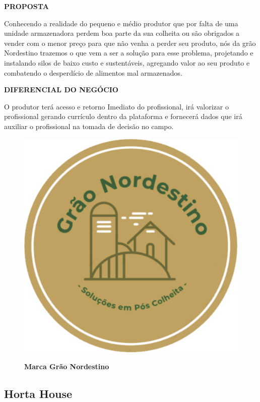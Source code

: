 \textbf{PROPOSTA}

Conhecendo a realidade do pequeno e médio produtor que por falta de uma unidade armazenadora perdem boa parte da sua colheita ou são obrigados a vender com o menor preço para que não venha a perder seu produto, nós da grão Nordestino trazemos o que vem a ser a solução para esse problema, projetando e instalando silos de baixo custo e sustentáveis, agregando valor ao seu produto e combatendo o desperdício de alimentos mal armazenados.

\textbf{DIFERENCIAL DO NEGÓCIO}

O produtor terá acesso e retorno Imediato do profissional, irá valorizar o profissional gerando currículo dentro da plataforma e fornecerá dados que irá auxiliar o profissional na tomada de decisão no campo.


\begin{figure}[!htb]
\centering
\caption{\textbf{Marca Grão Nordestino}}
\includegraphics[scale=0.3]{Imagens/graonordestino.png}
\label{figura_21}
\end{figure}
\newpage



\subsection{Horta House}

